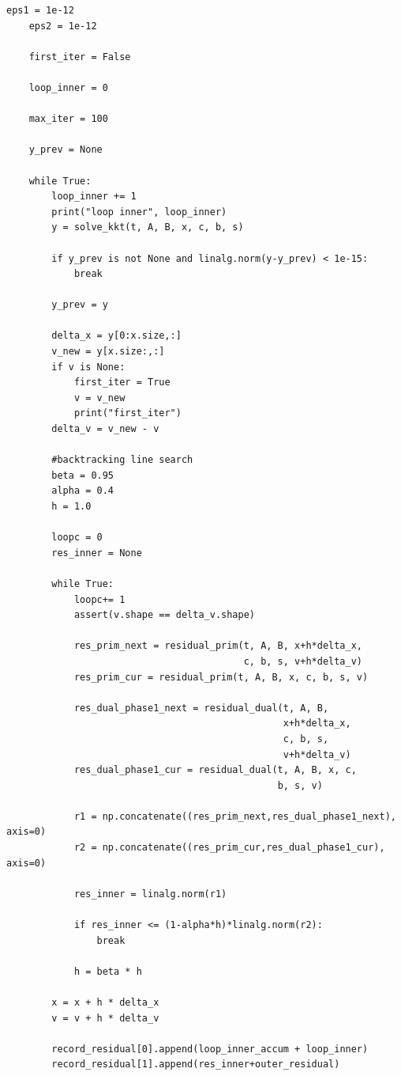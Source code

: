 \documentclass[12pt,letter]{article}
\begin{document}
\begin{enumerate}
\begin{itemize}
\begin{Verbatim}[fontsize=\small]
    eps1 = 1e-12
    eps2 = 1e-12

    first_iter = False

    loop_inner = 0

    max_iter = 100

    y_prev = None
    
    while True:
        loop_inner += 1
        print("loop inner", loop_inner) 
        y = solve_kkt(t, A, B, x, c, b, s)

        if y_prev is not None and linalg.norm(y-y_prev) < 1e-15:
            break
        
        y_prev = y
        
        delta_x = y[0:x.size,:]
        v_new = y[x.size:,:]
        if v is None:
            first_iter = True
            v = v_new
            print("first_iter")
        delta_v = v_new - v
        
        #backtracking line search
        beta = 0.95
        alpha = 0.4
        h = 1.0
        
        loopc = 0
        res_inner = None
        
        while True:
            loopc+= 1
            assert(v.shape == delta_v.shape)

            res_prim_next = residual_prim(t, A, B, x+h*delta_x,
                                          c, b, s, v+h*delta_v)
            res_prim_cur = residual_prim(t, A, B, x, c, b, s, v)

            res_dual_phase1_next = residual_dual(t, A, B,
                                                 x+h*delta_x,
                                                 c, b, s,
                                                 v+h*delta_v)
            res_dual_phase1_cur = residual_dual(t, A, B, x, c,
                                                b, s, v)

            r1 = np.concatenate((res_prim_next,res_dual_phase1_next), axis=0)
            r2 = np.concatenate((res_prim_cur,res_dual_phase1_cur), axis=0)
            
            res_inner = linalg.norm(r1)
            
            if res_inner <= (1-alpha*h)*linalg.norm(r2):
                break

            h = beta * h

        x = x + h * delta_x
        v = v + h * delta_v

        record_residual[0].append(loop_inner_accum + loop_inner)
        record_residual[1].append(res_inner+outer_residual)
        

\end{Verbatim}
\end{itemize}
\end{enumerate}
\end{document}
